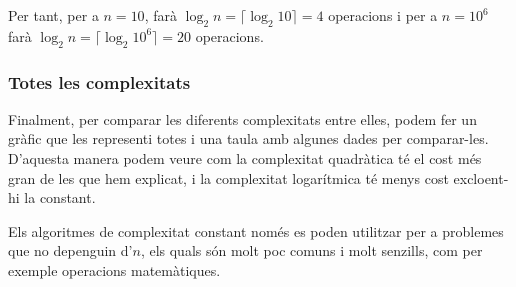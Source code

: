 Per tant, per a $n = 10$, farà $\log_2{n} = \lceil\log_2{10}\rceil = 4$ operacions i per a $n = 10^6$ farà $\log_2{n} = \lceil\log_2{10^6}\rceil = 20$ operacions.

\subsubsection*{Totes les complexitats}
Finalment, per comparar les diferents complexitats entre elles, podem fer un gràfic que les representi totes i una taula amb algunes dades per comparar-les. D'aquesta manera podem veure com la complexitat quadràtica té el cost més gran de les que hem explicat, i la complexitat logarítmica té menys cost excloent-hi la constant.

Els algoritmes de complexitat constant només es poden utilitzar per a problemes que no depenguin d'$n$, els quals són molt poc comuns i molt senzills, com per exemple operacions matemàtiques.

